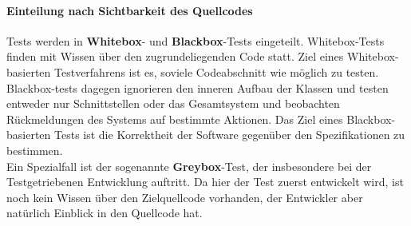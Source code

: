\paragraph{Einteilung nach Sichtbarkeit des Quellcodes} Tests werden in \textbf{Whitebox}- und \textbf{Blackbox}-Tests eingeteilt.
Whitebox-Tests finden mit Wissen über den zugrundeliegenden Code statt. Ziel eines Whitebox-basierten Testverfahrens ist es, soviele Codeabschnitt wie möglich zu testen.\\
Blackbox-tests dagegen ignorieren den inneren Aufbau der Klassen und testen entweder nur Schnittstellen oder das Gesamtsystem und beobachten Rückmeldungen des Systems auf bestimmte Aktionen. Das Ziel eines Blackbox-basierten Tests ist die Korrektheit der Software gegenüber den Spezifikationen zu bestimmen.\\
Ein Spezialfall ist der sogenannte \textbf{Greybox}-Test, der insbesondere bei der Testgetriebenen Entwicklung auftritt. Da hier der Test zuerst entwickelt wird, ist noch kein Wissen über den Zielquellcode vorhanden, der Entwickler aber natürlich Einblick in den Quellcode hat.

